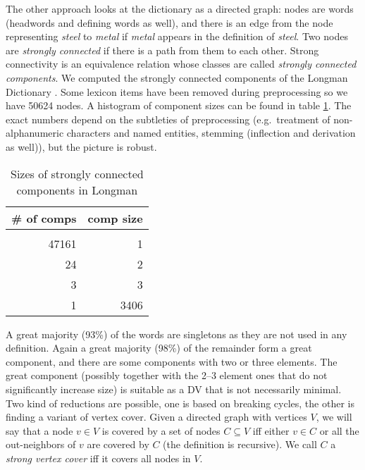 \documentclass[a4paper,10pt]{article}
\begin{document}
The other approach looks at the dictionary as a directed graph: nodes are words (headwords and defining words as well), and there is an edge from the node representing \emph{steel} to \emph{metal} if \emph{metal} appears in the definition of \emph{steel}. Two nodes are \emph{strongly connected} if there is a path from them to each other. Strong connectivity is an equivalence relation whose classes are called \emph{strongly connected components}. We computed the strongly connected components of the Longman Dictionary \cite{Bullon:2003}. Some lexicon items have been removed during preprocessing so we have 50624 nodes. A histogram of component sizes can be found in table \ref{table_compon}. The exact numbers depend on the subtleties of preprocessing (e.g.\ treatment of non-alphanumeric characters and named entities, stemming (inflection and derivation as well)), but the picture is robust.
\begin{table}
 \begin{center}
  \begin{tabular}{rr}
   \toprule
   \# of comps & comp size
   \\\midrule
   \\  47161	& 1
   \\  24	& 2
   \\  3	& 3
   \\  1        & 3406
   \\ \bottomrule
  \end{tabular}
  \caption{Sizes of strongly connected components in Longman}
  \label{table_compon}
 \end{center}
\end{table}
A great majority (93\%) of the words are singletons as they are not used in any definition. Again a great majority (98\%) of the remainder form a great component, and there are some components with two or three elements. The great component (possibly together with the 2--3 element ones that do not significantly increase size) is suitable as a DV that is not necessarily minimal. Two kind of reductions are possible, one is based on breaking cycles, the other is finding a variant of vertex cover. Given a directed graph with vertices $V$, we will say that a node $v\in V$ is covered by a set of nodes $C\subseteq V$ iff either $v\in C$ or all the out-neighbors of $v$ are covered by $C$ (the definition is recursive). We call $C$ a \emph{strong vertex cover} iff it covers all nodes in $V$.



\end{document}
